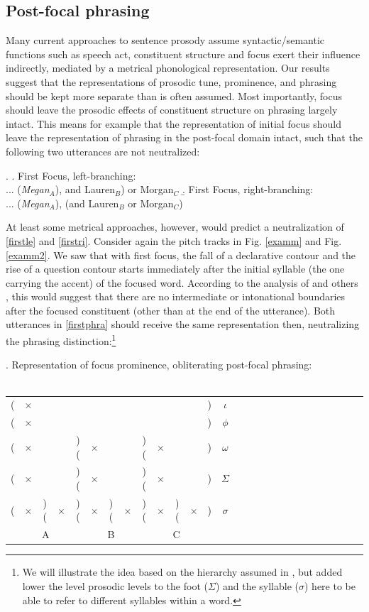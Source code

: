 \documentclass[preprint,review,12pt,authoryear,times]{elsarticle}
\newcommand{\g}{$\times$}
\begin{document}
\subsection{Post-focal phrasing}

Many current approaches to sentence prosody assume syntactic/semantic functions such as speech act, constituent structure and focus exert their influence indirectly, mediated by a metrical phonological representation. Our results suggest that the representations of prosodic tune, prominence, and phrasing should be kept more separate than is often assumed. Most importantly, focus should leave the prosodic effects of constituent structure on phrasing largely intact. This means for example that the representation of initial focus  should leave the representation of phrasing in the post-focal domain intact, such that the following two utterances are not neutralized:

\ex.\label{firstphra}
\a. First Focus, left-branching:\\
... ({\em Megan}$_A$), and Lauren$_B$) or Morgan$_C$\label{firstle}
\b. First Focus, right-branching:\\
 ... ({\em Megan}$_A$), (and {Lauren}$_B$ or Morgan$_C$)\label{firstri}
 
At least some metrical approaches, however, would predict a neutralization of \ref{firstle} and \ref{firstri}. Consider again the pitch tracks in Fig. \ref{examm} and Fig.  \ref{examm2}. We saw that with first focus, the fall of a declarative contour and the rise of a question contour starts immediately after the initial syllable (the one carrying the accent) of the focused word.  According to the analysis of \citet{pierr80} and others \citep[e.g.][]{beckm96}, this would suggest that there are no intermediate or intonational boundaries after the focused constituent (other than at the end of the utterance). Both utterances in \ref{firstphra} should receive the same representation then, neutralizing the phrasing distinction:\footnote{We will illustrate the idea based on the hierarchy assumed in \citet[][]{fery13}, but added lower the level prosodic levels to the foot ($\Sigma$) and the syllable ($\sigma$) here to be able to refer to different syllables within a word.}


\ex. Representation of focus prominence, obliterating post-focal phrasing:\\
\vspace{-10pt}\footnotesize
\ \\
\vspace{-12pt}
\setlength{\unitlength}{1cm}
\setlength\extrarowheight{-3pt}
\begin{tabular}{ccccccccccccccccccccccccccc}
 (&\g&&&&&&&&&&&)&\em $\iota$\\
(&\g&&&&&&&&&&&)&$\phi$\\
(&\g&&&)(&\g&&&)(&\g&&&)&$\omega$\\
(&\g&&&)(&\g&&&)(&\g&&&)&$\Sigma$\\
(&\g&)(&\g&)(&\g&)(&\g&)(&\g&)(&\g&)&$\sigma$\\
\multicolumn{5}{c}{A}&\multicolumn{3}{c}{B}&\multicolumn{5}{c}{C}\\
\end{tabular}
\vspace{15pt}
\end{document}
